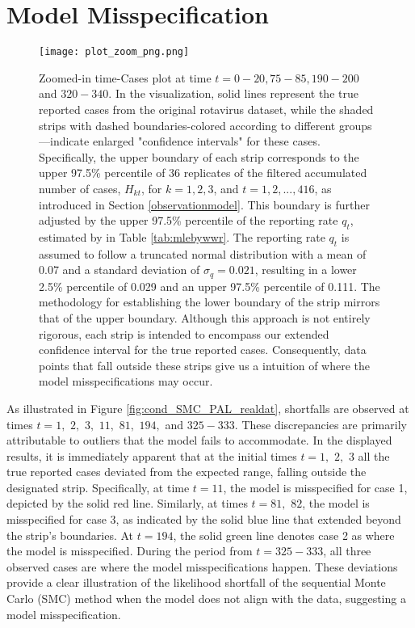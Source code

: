\documentclass[10pt]{article}
\begin{document}
\section{Model Misspecification}\label{appendB}

\begin{figure}[H]
\centering
\texttt{[image: plot\_zoom\_png.png]}
\caption{\label{fig:zoomedin_outlier_plot} Zoomed-in time-Cases plot at time $t=0-20, 75-85, 190-200$ and $320-340$. In the visualization, solid lines represent the true reported cases from the original rotavirus dataset, while the shaded strips with dashed boundaries-colored according to different groups—indicate enlarged "confidence intervals" for these cases. Specifically, the upper boundary of each strip corresponds to the upper 97.5\% percentile of 36 replicates of the filtered accumulated number of cases, $H_{kt}$, for $k=1,2,3$, and $t=1,2,...,416$, as introduced in Section \ref{observationmodel}. This boundary is further adjusted by the upper 97.5\% percentile of the reporting rate $q_t$, estimated by \cite{wwr} in Table \ref{tab:mlebywwr}. The reporting rate $q_t$ is assumed to follow a truncated normal distribution with a mean of 0.07 and a standard deviation of $\sigma_q = 0.021$, resulting in a lower 2.5\% percentile of 0.029 and an upper 97.5\% percentile of 0.111. The methodology for establishing the lower boundary of the strip mirrors that of the upper boundary. Although this approach is not entirely rigorous, each strip is intended to encompass our extended confidence interval for the true reported cases. Consequently, data points that fall outside these strips give us a intuition of where the model misspecifications may occur.}
\end{figure}

As illustrated in Figure \ref{fig:cond_SMC_PAL_realdat}, shortfalls are observed at times $t=1,\,\,2,\,\,3,\,\,11,\,\,81,\,\,194,$ and $325-333$. These discrepancies are primarily attributable to outliers that the model fails to accommodate. In the displayed results, it is immediately apparent that at the initial times $t=1, \,\,2, \,\,3$ all the true reported cases deviated from the expected range, falling outside the designated strip. Specifically, at time $t=11$, the model is misspecified for case 1, depicted by the solid red line. Similarly, at times $t=81,\,\, 82$, the model is misspecified for case 3, as indicated by the solid blue line that extended beyond the strip's boundaries. At $t=194$, the solid green line denotes case 2 as where the model is misspecified. During the period from $t=325-333$, all three observed cases are where the model misspecifications happen. These deviations provide a clear illustration of the likelihood shortfall of the sequential Monte Carlo (SMC) method when the model does not align with the data, suggesting a model misspecification. 

\newpage

\end{document}
